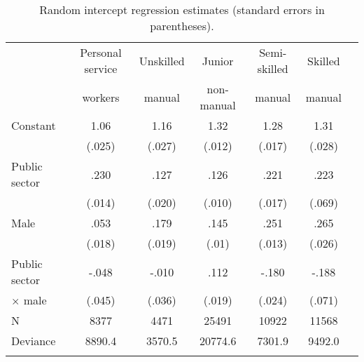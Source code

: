 \documentclass[a4paper,11pt,titlepage]{article}
\begin{document}
\begin{table}[tb]
\caption{Random intercept regression estimates (standard errors in parentheses).\label{tab:baseline}}
\begin{center}
\begin{tabular}{lcccccc}
\toprule
            &Personal service   &Unskilled &Junior      &Semi-skilled   &Skilled \\
            & workers           &manual    &non-manual  & manual        &manual \\
\midrule
Constant	&1.06 	            &1.16 	   &1.32	  	  &1.28 	        &1.31\\
					&(.025)	            &(.027)	   &(.012)	    &(.017)	        &(.028)\\
Public sector&.230		        &.127	   	 &.126			  &.221				    &.223\\
					&(.014)	            &(.020)	   &(.010)	    &(.017)	        &(.069)\\
Male			&.053							  &.179			 &.145			  &.251					  &.265\\
					&(.018)							&(.019)		 &(.01)				&(.013)					&(.026)\\
Public sector & -.048					&-.010		 &.112			  &-.180					&-.188\\
\quad $\times$ male &(.045)		&(.036)		 &(.019)			&(.024)					&(.071)\\
\midrule
N					&8377  	            &4471  	   &25491       &10922 	        &11568    \\
Deviance	&8890.4	            &3570.5	   &20774.6     &7301.9	        &9492.0\\
\\
\bottomrule
\end{tabular}


\end{center}
\end{table}
\end{document}
